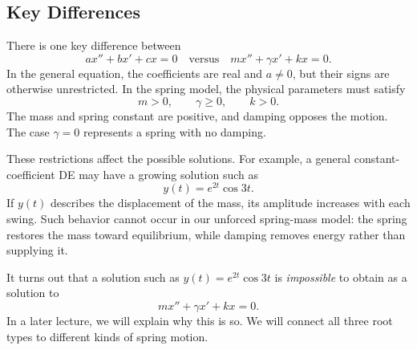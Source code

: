 \documentclass[10pt,letterpaper]{article}
\begin{document}
\subsection{Key Differences}

There is one key difference between
\[
ax''+bx'+cx=0 \quad \text{versus}\quad mx''+\gamma x'+kx=0.
\]
In the general equation, the coefficients are real and $a\ne0$,
but their signs are otherwise unrestricted. In the spring model,
the physical parameters must satisfy
\[
m>0,\qquad \gamma\ge0,\qquad k>0.
\]
The mass and spring constant are positive, and damping opposes
the motion. The case $\gamma=0$ represents a spring with no damping.

These restrictions affect the possible solutions. For example,
a general constant-coefficient DE may have a growing solution such as
\[
y(t)=e^{2t}\cos3t.
\]
If $y(t)$ describes the displacement of the mass, its amplitude
increases with each swing. Such behavior cannot occur in our
unforced spring-mass model: the spring restores the mass toward
equilibrium, while damping removes energy rather than supplying it.

It turns out that a solution such as $y(t)=e^{2t}\cos3t$ is \textit{impossible} to obtain as a solution to 
$$
mx''+\gamma x'+kx=0.
$$
In a later lecture, we will explain why this is so. We will connect all three root types to
different kinds of spring motion.
\end{document}
